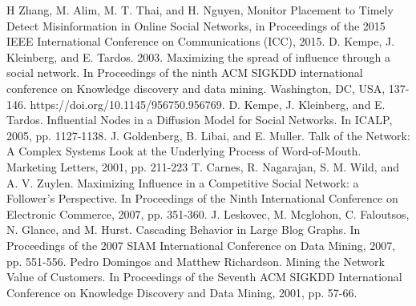 \begin{thebibliography}{4}
	 H Zhang, M. Alim, M. T. Thai, and H. Nguyen, Monitor Placement to Timely Detect Misinformation in Online Social Networks, in Proceedings of the 2015 IEEE International Conference on Communications (ICC), 2015.
	 D. Kempe, J. Kleinberg, and E. Tardos. 2003. Maximizing the spread of influence through a social network. In Proceedings of the ninth ACM SIGKDD international conference on Knowledge discovery and data mining. Washington, DC, USA, 137-146. https://doi.org/10.1145/956750.956769. 
	 D. Kempe, J. Kleinberg, and E. Tardos. Influential Nodes in a Diffusion Model for Social Networks. In ICALP, 2005, pp. 1127-1138.
	 J. Goldenberg, B. Libai, and E. Muller. Talk of the Network: A Complex Systems Look at the Underlying Process of Word-of-Mouth. Marketing Letters, 2001, pp. 211-223
	 T. Carnes, R. Nagarajan, S. M. Wild, and A. V. Zuylen. Maximizing Influence in a Competitive Social Network: a Follower’s Perspective. In Proceedings of the Ninth International Conference on Electronic Commerce, 2007, pp. 351-360.
	 J. Leskovec, M. Mcglohon, C. Faloutsos, N. Glance, and M. Hurst. Cascading Behavior in Large Blog Graphs. In Proceedings of the 2007 SIAM International Conference on Data Mining, 2007, pp. 551-556.
	 Pedro Domingos and Matthew Richardson. Mining the Network Value of Customers. In Proceedings of the Seventh ACM SIGKDD International Conference on Knowledge Discovery and Data Mining, 2001, pp. 57-66.
	

\end{thebibliography}
